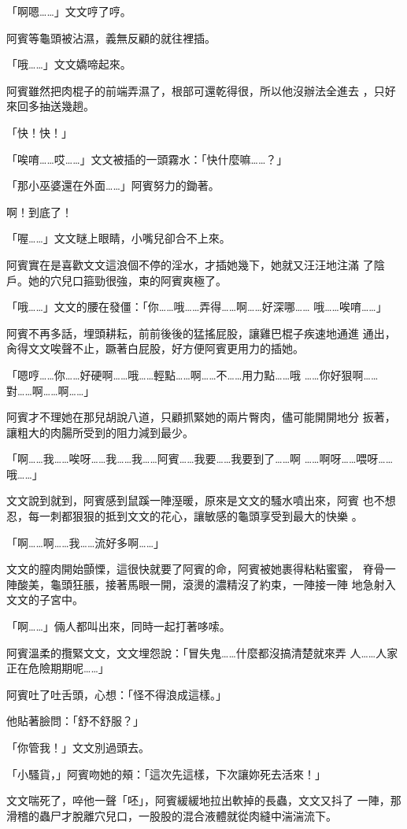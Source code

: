 「啊嗯……」文文哼了哼。

阿賓等龜頭被沾濕，義無反顧的就往裡插。

「哦……」文文嬌啼起來。

阿賓雖然把肉棍子的前端弄濕了，根部可還乾得很，所以他沒辦法全進去
，只好來回多抽送幾趟。

「快！快！」

「唉唷……哎……」文文被插的一頭霧水：「快什麼嘛……？」

「那小巫婆還在外面……」阿賓努力的鋤著。

啊！到底了！

「喔……」文文瞇上眼睛，小嘴兒卻合不上來。

阿賓實在是喜歡文文這浪個不停的淫水，才插她幾下，她就又汪汪地注滿
了陰戶。她的穴兒口箍勁很強，束的阿賓爽極了。

「哦……」文文的腰在發僵：「你……哦……弄得……啊……好深哪……
哦……唉唷……」

阿賓不再多話，埋頭耕耘，前前後後的猛搖屁股，讓雞巴棍子疾速地通進
通出，肏得文文唉聲不止，蹶著白屁股，好方便阿賓更用力的插她。

「嗯哼……你……好硬啊……哦……輕點……啊……不……用力點……哦
……你好狠啊……對……啊……啊……」

阿賓才不理她在那兒胡說八道，只顧抓緊她的兩片臀肉，儘可能開開地分
扳著，讓粗大的肉腸所受到的阻力減到最少。

「啊……我……唉呀……我……我……阿賓……我要……我要到了……啊
……啊呀……喂呀……哦……」

文文說到就到，阿賓感到鼠蹊一陣溼暖，原來是文文的騷水噴出來，阿賓
也不想忍，每一刺都狠狠的抵到文文的花心，讓敏感的龜頭享受到最大的快樂
。

「啊……啊……我……流好多啊……」

文文的膣肉開始顫慄，這很快就要了阿賓的命，阿賓被她裹得粘粘蜜蜜，
脊骨一陣酸美，龜頭狂脹，接著馬眼一開，滾燙的濃精沒了約束，一陣接一陣
地急射入文文的子宮中。

「啊……」倆人都叫出來，同時一起打著哆嗦。

阿賓溫柔的攬緊文文，文文埋怨說：「冒失鬼……什麼都沒搞清楚就來弄
人……人家正在危險期期呢……」

阿賓吐了吐舌頭，心想：「怪不得浪成這樣。」

他貼著臉問：「舒不舒服？」

「你管我！」文文別過頭去。

「小騷貨，」阿賓吻她的頰：「這次先這樣，下次讓妳死去活來！」

文文喘死了，啐他一聲「呸」，阿賓緩緩地拉出軟掉的長蟲，文文又抖了
一陣，那滑稽的蟲尸才脫離穴兒口，一股股的混合液體就從肉縫中湍湍流下。

